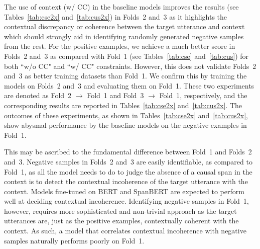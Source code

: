 \documentclass[smallextended]{svjour3}
\newcommand\0{\hphantom{0}}
\begin{document}
    




    


The use of context (w/ CC) in the baseline models improves the results (see Tables~\ref{tab:cse2x} and~\ref{tab:cus2x}) in Folds~2 and~3 as it highlights the contextual discrepancy or coherence between the target utterance and context which should strongly aid in identifying randomly generated negative samples from the rest. For the positive examples, we achieve a much better score in Folds~2 and~3 as compared with Fold~1 (see Tables~\ref{tab:cse} and~\ref{tab:cus}) for both ``w/o CC" and ``w/ CC" constraints. However, this does not validate Folds~2 and~3 as better training datasets than Fold~1. We confirm this by training the models on Folds~2 and~3 and evaluating them on Fold~1. These two experiments are denoted as {Fold~2 $\to$ Fold~1} and {Fold~3 $\to$ Fold~1}, respectively, and the corresponding results are reported in Tables~\ref{tab:cse2x} and~\ref{tab:cus2x}. The outcomes of these experiments, as shown in Tables~\ref{tab:cse2x} and~\ref{tab:cus2x}, show abysmal performance by the baseline models on the negative examples in Fold~1.

This may be ascribed to the fundamental difference between Fold~1 and Folds~2 and~3. Negative samples in Folds~2 and~3 are easily identifiable, as compared to Fold~1, as all the model needs to do to judge the absence of a causal span in the context is to detect the contextual incoherence of the target utterance with the context. Models fine-tuned on BERT and SpanBERT are expected to perform well at deciding contextual incoherence. Identifying negative samples in Fold~1, however, requires more sophisticated and non-trivial approach as the target utterances are, just as the positive examples, contextually coherent with the context. As such, a model that correlates contextual incoherence with negative samples naturally performs poorly on Fold~1.
\end{document}
